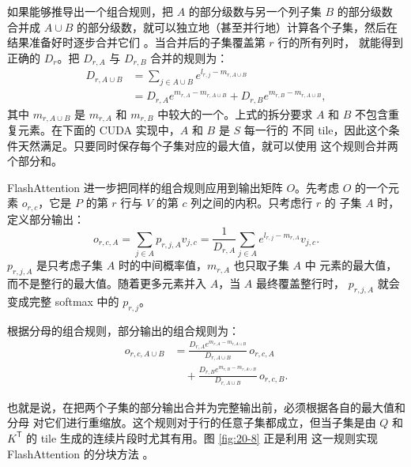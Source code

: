 如果能够推导出一个组合规则，把 $A$ 的部分级数与另一个列子集 $B$ 的部分级数
合并成 $A\cup B$ 的部分级数，就可以独立地（甚至并行地）计算各个子集，然后在
结果准备好时逐步合并它们 \cite{ch20-7}。当合并后的子集覆盖第 $r$ 行的所有列时，
就能得到正确的 $D_r$。把 $D_{r,A}$ 与 $D_{r,B}$ 合并的规则为：
\begin{equation}
\begin{aligned}
  D_{r,A\cup B}
  &=\sum_{j\in A\cup B}e^{l_{r,j}-m_{r,A\cup B}}\\
  &=D_{r,A}e^{m_{r,A}-m_{r,A\cup B}}
    +D_{r,B}e^{m_{r,B}-m_{r,A\cup B}},
\end{aligned}
\label{eq:ch20-denominator-composition}
\end{equation}
其中 $m_{r,A\cup B}$ 是 $m_{r,A}$ 和 $m_{r,B}$ 中较大的一个。上式的拆分要求
$A$ 和 $B$ 不包含重复元素。在下面的 CUDA 实现中，$A$ 和 $B$ 是 $S$ 每一行的
不同 tile，因此这个条件天然满足。只要同时保存每个子集对应的最大值，就可以使用
这个规则合并两个部分和。

FlashAttention 进一步把同样的组合规则应用到输出矩阵 $O$。先考虑 $O$ 的一个元素
$o_{r,c}$，它是 $P$ 的第 $r$ 行与 $V$ 的第 $c$ 列之间的内积。只考虑行 $r$ 的
子集 $A$ 时，定义部分输出：
\begin{equation}
  o_{r,c,A}
  =\sum_{j\in A}p_{r,j,A}v_{j,c}
  =\frac{1}{D_{r,A}}
    \sum_{j\in A}e^{l_{r,j}-m_{r,A}}v_{j,c}.
\label{eq:ch20-partial-output}
\end{equation}
$p_{r,j,A}$ 是只考虑子集 $A$ 时的中间概率值，$m_{r,A}$ 也只取子集 $A$ 中
元素的最大值，而不是整行的最大值。随着更多元素并入 $A$，当 $A$ 最终覆盖整行时，
$p_{r,j,A}$ 就会变成完整 softmax 中的 $p_{r,j}$。

根据分母的组合规则，部分输出的组合规则为：
\begin{equation}
\begin{aligned}
  o_{r,c,A\cup B}
  &=
  \frac{D_{r,A}e^{m_{r,A}-m_{r,A\cup B}}}
       {D_{r,A\cup B}}\,o_{r,c,A}\\
  &\quad+
  \frac{D_{r,B}e^{m_{r,B}-m_{r,A\cup B}}}
       {D_{r,A\cup B}}\,o_{r,c,B}.
\end{aligned}
\label{eq:ch20-output-composition}
\end{equation}

也就是说，在把两个子集的部分输出合并为完整输出前，必须根据各自的最大值和分母
对它们进行重缩放。这个规则对于行的任意子集都成立，但当子集是由 $Q$ 和
$K^{\mathsf T}$ 的 tile 生成的连续片段时尤其有用。图 \ref{fig:20-8} 正是利用
这一规则实现 FlashAttention 的分块方法 \cite{ch20-8}。


